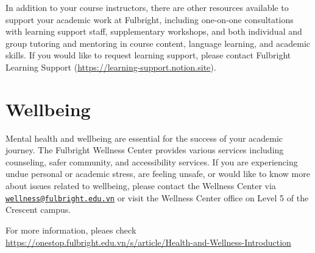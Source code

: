 \documentclass[
  openany]{book}
\begin{document}
In addition to your course instructors, there are other resources available to support your
academic work at Fulbright, including one-on-one consultations with learning support staff,
supplementary workshops, and both individual and group tutoring and mentoring in course
content, language learning, and academic skills. If you would like to request learning support,
please contact Fulbright Learning Support (\url{https://learning-support.notion.site}).

\section*{Wellbeing}\label{wellbeing}

Mental health and wellbeing are essential for the success of your academic journey. The
Fulbright Wellness Center provides various services including counseling, safer community,
and accessibility services. If you are experiencing undue personal or academic stress, are
feeling unsafe, or would like to know more about issues related to wellbeing, please contact
the Wellness Center via \href{mailto:wellness@fulbright.edu.vn}{\nolinkurl{wellness@fulbright.edu.vn}} or visit the Wellness Center office on
Level 5 of the Crescent campus.

For more information, pleaes check
\url{https://onestop.fulbright.edu.vn/s/article/Health-and-Wellness-Introduction}
\end{document}
